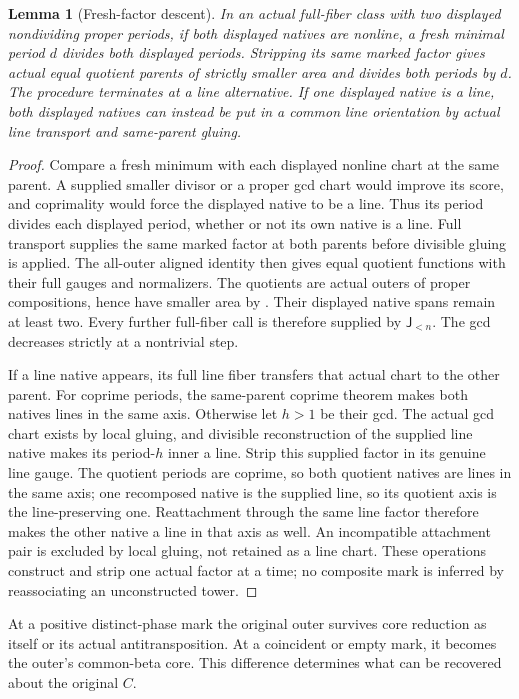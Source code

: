 \documentclass[11pt,a4paper]{amsart}
\numberwithin{equation}{section}
\theoremstyle{plain}
\newtheorem{lemma}[theorem]{Lemma}
\theoremstyle{definition}
\newcommand{\Jlower}{\mathsf J_{<n}}
\begin{document}
\begin{lemma}[Fresh-factor descent]\label{lem:fresh-descent}
In an actual full-fiber class with two displayed nondividing proper periods,
if both displayed natives are nonline, a fresh minimal period \(d\) divides
both displayed periods.  Stripping its same marked factor gives actual equal
quotient parents of strictly smaller area and divides both periods by \(d\).
The procedure terminates at a line alternative.  If one displayed native is
a line, both displayed natives can instead be put in a common line
orientation by actual line transport and same-parent gluing.
\end{lemma}
\begin{proof}
Compare a fresh minimum with each displayed nonline chart at the same
parent.  A supplied smaller divisor or a proper gcd chart would improve its
score, and coprimality would force the displayed native to be a line.
Thus its period divides each displayed period, whether or not its own
native is a line.  Full transport supplies the same marked factor at both
parents before divisible gluing is applied.  The all-outer aligned identity
then gives equal quotient functions with their full gauges and normalizers.
The quotients are actual outers of proper compositions, hence have smaller
area by .  Their displayed native spans remain at least
two.  Every further full-fiber call is therefore supplied by \(\Jlower\).
The gcd decreases strictly at a nontrivial step.

If a line native appears, its full line fiber transfers that actual chart
to the other parent.  For coprime periods, the same-parent coprime theorem
makes both natives lines in the same axis.  Otherwise let \(h>1\) be their
gcd.  The actual gcd chart exists by local gluing, and divisible
reconstruction of the supplied line native makes its period-\(h\) inner a
line.  Strip this supplied factor in its genuine line gauge.  The quotient
periods are coprime, so both quotient natives are lines in the same axis;
one recomposed native is the supplied line, so its quotient axis is the
line-preserving one.  Reattachment through the same line factor therefore
makes the other native a line in that axis as well.  An
incompatible attachment pair is excluded by local gluing, not retained as
a line chart.  These operations construct and strip one actual factor at
a time; no composite mark is inferred by reassociating an unconstructed
tower.
\end{proof}

At a positive distinct-phase mark the original outer survives core reduction
as itself or its actual antitransposition.  At a coincident or empty mark,
it becomes the outer's common-beta core.  This difference determines what
can be recovered about the original \(C\).
\end{document}
